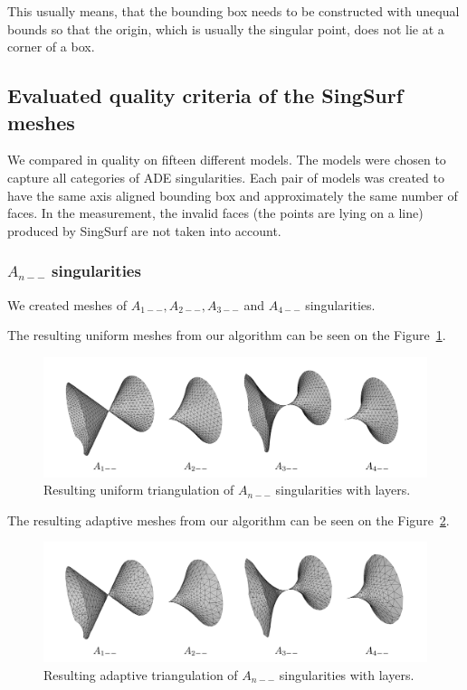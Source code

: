 This usually means, that the bounding box needs to be constructed with unequal bounds 
so that the origin, which is usually the singular point, does not lie at a corner of a box.

\clearpage
\subsection{Evaluated quality criteria of the SingSurf meshes}
We compared in quality on fifteen different models. The models were chosen
to capture all categories of ADE singularities. Each pair of models was 
created to have the same axis aligned bounding box and approximately the
same number of faces. In the measurement, the invalid faces 
(the points are lying on a line) produced by SingSurf are not taken into 
account.

\subsubsection*{$A_{n--}$ singularities}
We created meshes of $A_{1--}, A_{2--}, A_{3--}$ and $A_{4--}$ singularities.

The resulting uniform meshes from our algorithm can be seen on the 
Figure~\ref{img:61}.
\begin{figure}[h!]
    \centerline{\includegraphics[scale=0.24]{images/img61}}
    \caption[Resulting uniform triangulation of $A_{n--}$ singularities]
    {Resulting uniform triangulation of $A_{n--}$ singularities with layers.}
    \label{img:61}
\end{figure} 

The resulting adaptive meshes from our algorithm can be seen on the 
Figure~\ref{img:60}.
\begin{figure}[h!]
    \centerline{\includegraphics[scale=0.5]{images/img60}}
    \caption[Resulting adaptive triangulation of $A_{n--}$ singularities]
    {Resulting adaptive triangulation of $A_{n--}$ singularities with layers.}
    \label{img:60}
\end{figure}

